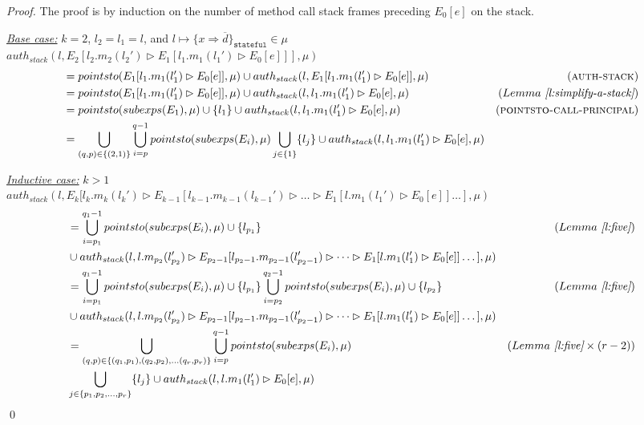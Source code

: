 \documentclass{llncs}
\newcommand{\keywadj}[1]{\mathtt{#1}}
\begin{document}
\begin{proof} The proof is by induction on the number of method call stack frames preceding $E_0[e]$ on the stack.

\noindent\underline{\textit{Base case:}} $k = 2$, $l_2 = l_1 = l$, and $l \mapsto \{ x \Rightarrow \overline{d} \}_{\keywadj{stateful}} \in \mu$\\
\noindent$auth_{stack}(l, E_2[l_2.m_2(l_2') \rhd E_1[l_1.m_1(l_1') \rhd E_0[e]]], \mu)$
\vspace{-7pt}
\begin{align*}
&= pointsto(E_1[l_1.m_1(l_1') \rhd E_0[e]], \mu) \cup auth_{stack}(l, E_1[l_1.m_1(l_1') \rhd E_0[e]], \mu) & (\textsc{auth-stack}) \\
&= pointsto(E_1[l_1.m_1(l_1') \rhd E_0[e]], \mu) \cup auth_{stack}(l, l_1.m_1(l_1') \rhd E_0[e], \mu) & (Lemma~\textit{\ref{l:simplify-a-stack}}) \\
&= pointsto(subexps(E_1), \mu) \cup \{ l_1 \} \cup auth_{stack}(l, l_1.m_1(l_1') \rhd E_0[e], \mu) & (\textsc{pointsto-call-principal})\\
&= \bigcup_{(q, p) \in \{ (2, 1) \}} \bigcup^{q-1}_{i = p} pointsto(subexps(E_i), \mu) \bigcup_{j \in \{ 1 \}} \{ l_j \} \cup auth_{stack}(l, l_1.m_1(l_1') \rhd E_0[e], \mu)
\end{align*}

\noindent\underline{\textit{Inductive case:}} $k > 1$\\
\noindent$auth_{stack}(l, E_k[l_k.m_k(l_k') \rhd E_{k-1}[l_{k-1}.m_{k-1}(l_{k-1}') \rhd \dots \rhd E_1[l.m_1(l_1') \rhd E_0[e]] \dots ], \mu)$
\vspace{-7pt}
\begin{align*}
& =\bigcup^{q_1-1}_{i = p_1} pointsto(subexps(E_i), \mu) \cup \{ l_{p_1} \} & (Lemma~\textit{\ref{l:five}})\\
&\cup auth_{stack}(l, l.m_{p_2}(l_{p_2}') \rhd E_{p_2-1}[l_{p_2-1}.m_{p_2-1}(l_{p_2-1}') \rhd \dots \rhd E_1[l.m_1(l_1') \rhd E_0[e]] \dots ], \mu)\\
& =\bigcup^{q_1-1}_{i = p_1} pointsto(subexps(E_i), \mu) \cup \{ l_{p_1} \} \bigcup^{q_2-1}_{i = p_2} pointsto(subexps(E_i), \mu) \cup \{ l_{p_2} \} & (Lemma~\textit{\ref{l:five}})\\
&\cup auth_{stack}(l, l.m_{p_2}(l_{p_2}') \rhd E_{p_2-1}[l_{p_2-1}.m_{p_2-1}(l_{p_2-1}') \rhd \dots \rhd E_1[l.m_1(l_1') \rhd E_0[e]] \dots ], \mu)\\
&=  \bigcup_{(q, p) \in \{ (q_1, p_1), (q_2, p_2), \dots (q_r, p_r) \}} \bigcup^{q-1}_{i = p} pointsto(subexps(E_i), \mu) & (Lemma~\textit{\ref{l:five}} \times (r - 2))\\
&\bigcup_{j \in \{ p_1, p_2, \dots, p_r \}} \{ l_j \} \cup auth_{stack}(l, l.m_1(l_1') \rhd E_0[e], \mu)
\end{align*}
\qed
\end{proof}
\end{document}
